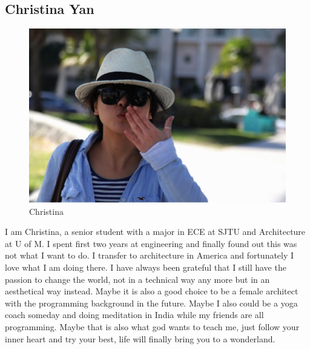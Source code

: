 \documentclass[paper=letter, fontsize=11pt]{scrartcl}
\numberwithin{equation}{section}		%
\numberwithin{figure}{section}			%
\numberwithin{table}{section}			%
\begin{document}
\subsection{Christina Yan}
\begin{figure}[H]
	\centering
	\includegraphics[scale=1]{Christina}
	\caption{Christina}
\end{figure}
I am Christina, a senior student with a major in ECE at SJTU and Architecture at U of M. I spent first two years at engineering and finally found out this was not what I want to do. I transfer to architecture in America and fortunately I love what I am doing there. I have always been grateful that I still have the passion to change the world, not in a technical way any more but in an aesthetical way instead. Maybe it is also a good choice to be a female architect with the programming background in the future. Maybe I also could be a yoga coach someday and doing meditation in India while my friends are all programming. Maybe that is also what god wants to teach me, just follow your inner heart and try your best, life will finally bring you to a wonderland.
\pagebreak
\end{document}
